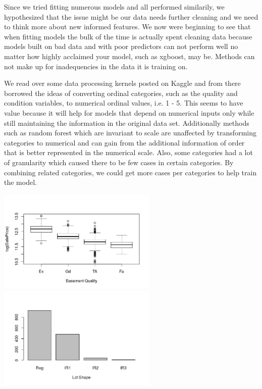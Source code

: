 \documentclass[12pt]{article}
\begin{document}
Since we tried fitting numerous models and all performed similarily, we hypothesized that the issue might be our data needs further cleaning and we need to think more about new informed features.  We now were beginning to see that when fitting models the bulk of the time is actually spent cleaning data because models built on bad data and with poor predictors can not perform well no matter how highly acclaimed your model, such as xgboost, may be.  Methods can not make up for inadequencies in the data it is training on.

We read over some data processing kernels posted on Kaggle and from there borrowed the ideas of converting ordinal categories, such as the quality and condition variables, to numerical ordinal values, i.e. 1 - 5.  This seems to have value because it will help for models that depend on numerical inputs only while still maintaining the information in the original data set.  Additionally methods such as random forest which are invariant to scale are unaffected by transforming categories to numerical and can gain from the additional information of order that is better represented in the numerical scale.  Also, some categories had a lot of granularity which caused there to be few cases in certain categories.  By combining related categories, we could get more cases per categories to help train the model.  

\begin{center}
\includegraphics[width = 3in]{bsmtqual.png}
\includegraphics[width = 3in]{lotshape.png}
\end{center}
\end{document}
